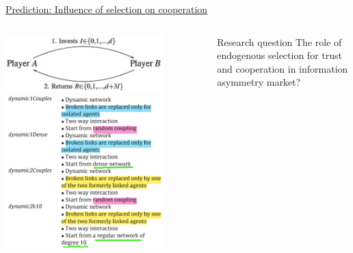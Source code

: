\documentclass[compress]{beamer}
\begin{document}
\begin{frame}{\href{https://www.sciencedirect.com/science/article/pii/S0378873312000202}{Prediction: Influence of selection on cooperation\cite{bravo2012trust}}}

    \begin{columns}[c]
        \begin{column}{.5\textwidth}
            \centering
            \includegraphics[width=0.8\textwidth]{InvestmentGame.png}\\[0.5cm]
            \includegraphics[width=0.8\textwidth]{ABMExp.png}
        \end{column}
        \begin{column}{.5\textwidth}
            \raggedright
            \begin{minipage}{5.8cm}
                \begin{block}{Research question}
                    The role of endogenous selection for trust and cooperation in information asymmetry market?
                \end{block}

\end{minipage}
\end{column}
\end{columns}
\end{frame}
\end{document}
